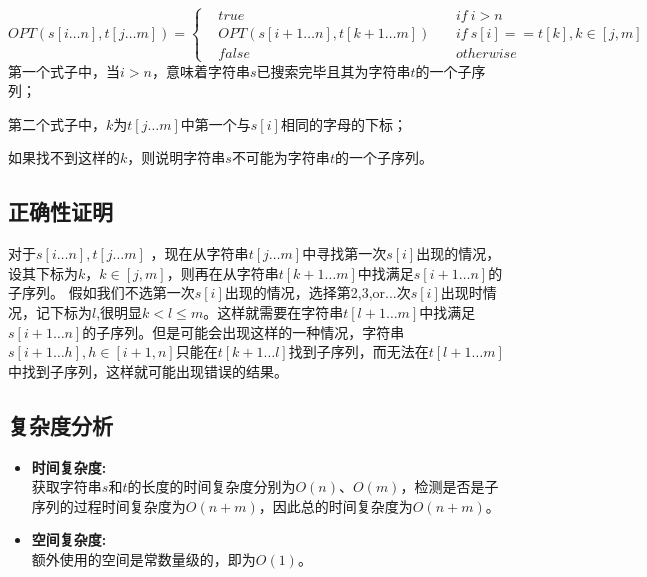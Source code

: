 \documentclass[UTF8,a4paper,12pt]{article}
\begin{document}
\begin{CJK}{UTF8}{gkai}
		$$ OPT(s[i\dots n],t[j\dots m]) = \left\{
		\begin{aligned}
			& true &&\ if\ i>n\\
			& OPT(s[i+1\dots n],t[k+1\dots m]) &&\ if\ s[i]==t[k],k\in[j,m]\\
			& false	&&\ otherwise
		\end{aligned}
		\right.
		$$
		第一个式子中，当$ i>n $，意味着字符串$ s $已搜索完毕且其为字符串$ t $的一个子序列；
		
		第二个式子中，$ k $为$ t[j\dots m] $中第一个与$ s[i]$相同的字母的下标；
		
		如果找不到这样的$ k $，则说明字符串$ s $不可能为字符串$ t $的一个子序列。

	\subsection{正确性证明}
		对于$ s[i\dots n],t[j\dots m] $ ，现在从字符串$t[j\dots m] $中寻找第一次$ s[i] $出现的情况，设其下标为$ k，k\in[j,m] $，则再在从字符串$t[k+1\dots m] $中找满足$ s[i+1\dots n] $的子序列。
		假如我们不选第一次$ s[i] $出现的情况，选择第{2,3,or...}次$ s[i] $出现时情况，记下标为$ l $,很明显$ k<l\le m $。这样就需要在字符串$t[l+1\dots m] $中找满足$ s[i+1\dots n] $的子序列。但是可能会出现这样的一种情况，字符串$ s[i+1\dots h],h\in[i+1,n] $只能在$t[k+1\dots l]$找到子序列，而无法在$t[l+1\dots m] $中找到子序列，这样就可能出现错误的结果。
	
	\subsection{复杂度分析}		
		\begin{itemize}
			\item{\textbf{时间复杂度:}} \\
				获取字符串$ s $和$ t $的长度的时间复杂度分别为$ O(n)、O(m) $，检测是否是子序列的过程时间复杂度为$ O(n+m) $，因此总的时间复杂度为$ O(n+m) $。
			\item{\textbf{空间复杂度:}}\\
				额外使用的空间是常数量级的，即为$ O(1) $。
		\end{itemize}
	\end{CJK}	
\end{document}
